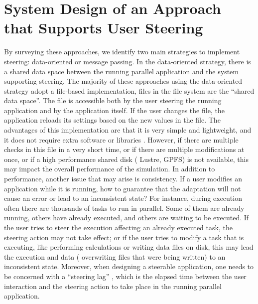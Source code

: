 \section{System Design of an Approach that Supports User Steering}

By surveying these approaches, we identify two main strategies to implement steering: data-oriented or message
passing. In the data-oriented strategy, there is a shared data space
between the running parallel application and the system supporting
steering. The majority of these approaches using the data-oriented strategy
adopt a file-based implementation, \ie{} files in the file system
are the ``shared data space''. The file is accessible both by the user
steering the running application and by the application itself. If the
user changes the file, the application reloads its settings based on the
new values in the file. The advantages of this implementation are that
it is very simple and lightweight, and it does not require extra
software or libraries \cite{Pickles2005practical}.
However, if there are multiple checks in this file in a very short
time, or if there are multiple modifications at once, or if a
high performance shared disk (\eg{} Lustre, GPFS) is not
available, this may impact the overall performance of the simulation. In
addition to performance, another issue that may arise is consistency. If
a user modifies an application while it is running, how to guarantee
that the adaptation will not cause an error or lead to an inconsistent
state? For instance, during execution often there are thousands of tasks
to run in parallel. Some of them are already running, others have
already executed, and others are waiting to be executed. If the user
tries to steer the execution affecting an already executed task, the
steering action may not take effect; or if the user tries to modify a
task that is executing, like performing calculations or writing data
files on disk, this may lead the execution and data (\eg{}
overwriting files that were being written) to an inconsistent state.
Moreover, when designing a steerable application, one needs to be
concerned with a ``steering lag'' \cite{Hart1999Consistency},
which is the elapsed time between the user interaction and the steering
action to take place in the running parallel application.

